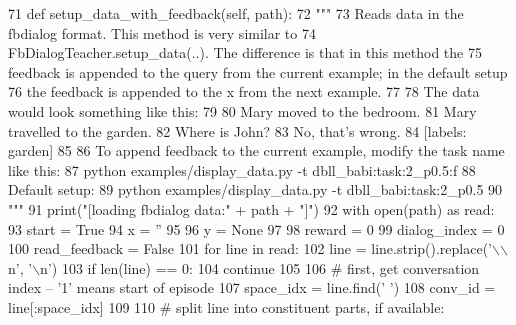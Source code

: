 \begin{DoxyCode}
71     \textcolor{keyword}{def }setup\_data\_with\_feedback(self, path):
72         \textcolor{stringliteral}{"""}
73 \textcolor{stringliteral}{        Reads data in the fbdialog format. This method is very similar to}
74 \textcolor{stringliteral}{        FbDialogTeacher.setup\_data(..). The difference is that in this method the}
75 \textcolor{stringliteral}{        feedback is appended to the query from the current example; in the default setup}
76 \textcolor{stringliteral}{        the feedback is appended to the x from the next example.}
77 \textcolor{stringliteral}{}
78 \textcolor{stringliteral}{        The data would look something like this:}
79 \textcolor{stringliteral}{}
80 \textcolor{stringliteral}{        Mary moved to the bedroom.}
81 \textcolor{stringliteral}{        Mary travelled to the garden.}
82 \textcolor{stringliteral}{        Where is John?}
83 \textcolor{stringliteral}{        No, that's wrong.}
84 \textcolor{stringliteral}{        [labels: garden]}
85 \textcolor{stringliteral}{}
86 \textcolor{stringliteral}{        To append feedback to the current example, modify the task name like this:}
87 \textcolor{stringliteral}{          python examples/display\_data.py -t dbll\_babi:task:2\_p0.5:f}
88 \textcolor{stringliteral}{        Default setup:}
89 \textcolor{stringliteral}{          python examples/display\_data.py -t dbll\_babi:task:2\_p0.5}
90 \textcolor{stringliteral}{        """}
91         print(\textcolor{stringliteral}{"[loading fbdialog data:"} + path + \textcolor{stringliteral}{"]"})
92         with open(path) \textcolor{keyword}{as} read:
93             start = \textcolor{keyword}{True}
94             x = \textcolor{stringliteral}{''}
95 
96             y = \textcolor{keywordtype}{None}
97 
98             reward = 0
99             dialog\_index = 0
100             read\_feedback = \textcolor{keyword}{False}
101             \textcolor{keywordflow}{for} line \textcolor{keywordflow}{in} read:
102                 line = line.strip().replace(\textcolor{stringliteral}{'\(\backslash\)\(\backslash\)n'}, \textcolor{stringliteral}{'\(\backslash\)n'})
103                 \textcolor{keywordflow}{if} len(line) == 0:
104                     \textcolor{keywordflow}{continue}
105 
106                 \textcolor{comment}{# first, get conversation index -- '1' means start of episode}
107                 space\_idx = line.find(\textcolor{stringliteral}{' '})
108                 conv\_id = line[:space\_idx]
109 
110                 \textcolor{comment}{# split line into constituent parts, if available:}

\end{DoxyCode}
